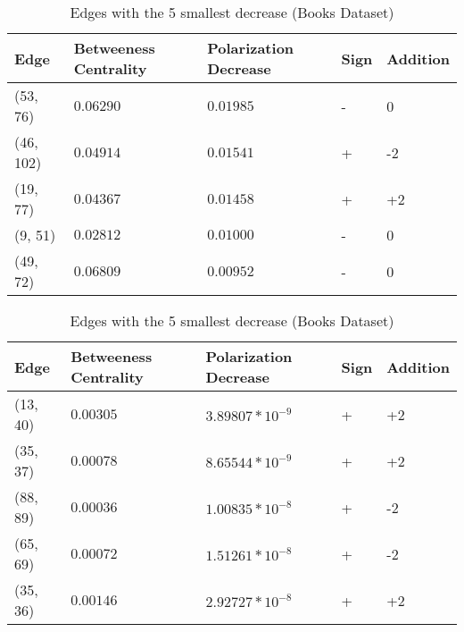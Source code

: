 \begin{table}[!htb]
 \centering
 \caption{Edges with the 5 largest decrease (Books Dataset)}
 \label{tab:edgesLargest}
 \begin{tabular}{| l || l | l | l | l |}
 \hline
  Edge & Betweeness Centrality & Polarization Decrease & Sign & Addition\\
  \hline
  \hline
  (53, 76) & $0.06290$ & $0.01985$ & - &  0\\
  \hline
  (46, 102) & $0.04914$ & $0.01541$ & + &  -2\\
  \hline
  (19, 77) & $0.04367$ & $0.01458$ & + &  +2\\
  \hline
  (9, 51) & $0.02812$ & $0.01000$ & - &  0\\
  \hline
  (49, 72) & $0.06809$ & $0.00952$ & - &  0\\
  \hline
 \end{tabular}
 
 \vspace{\floatsep}
 
 \caption{Edges with the 5 smallest decrease (Books Dataset)}
 \label{tab:edgesLargest}
 \begin{tabular}{| l || l | l | l | l |}
 \hline
  Edge & Betweeness Centrality & Polarization Decrease & Sign & Addition\\
  \hline
  \hline
  (13, 40) & $0.00305$ & $3.89807*10^{-9}$ & + &  +2\\
  \hline
  (35, 37) & $0.00078$ & $8.65544*10^{-9}$ & + &  +2\\
  \hline
  (88, 89) & $0.00036$ & $1.00835*10^{-8}$ & + &  -2\\
  \hline
  (65, 69) & $0.00072$ & $1.51261*10^{-8}$ & + &  -2\\
  \hline
  (35, 36) & $0.00146$ & $2.92727*10^{-8}$ & + &  +2\\
  \hline
  \hline
 \end{tabular}
 
\end{table}



